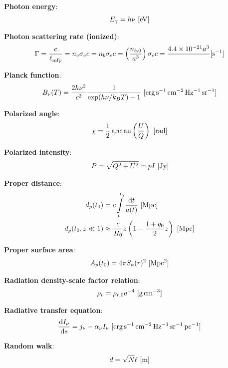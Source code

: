 \documentclass[a4paper,11pt]{article}
\begin{document}
{\noindent}\textbf{Photon energy}:
\begin{align*}
    E_\gamma = h\nu ~ [{\rm eV}]
\end{align*}

{\noindent}\textbf{Photon scattering rate (ionized)}:
\begin{align*}
    \Gamma = \dfrac{c}{\ell_\mathrm{mfp}} = n_e\sigma_ec = n_b\sigma_ec = \left(\dfrac{n_{b,0}}{a^3}\right)\sigma_ec = \dfrac{4.4\times10^{-21}{a^3}} ~ [{\rm s^{-1}}]
\end{align*}

{\noindent}\textbf{Planck function}:
\begin{align*}
    B_\nu(T) = \frac{2h\nu^2}{c^2} \frac{1}{\exp(h\nu/k_BT) - 1} ~ [{\rm erg\,s^{-1}\,cm^{-2}\,Hz^{-1}\,sr^{-1}}]
\end{align*}

{\noindent}\textbf{Polarized angle}:
\begin{align*}
    \chi = \frac{1}{2}\arctan\left(\frac{U}{Q}\right) ~ [{\rm rad}]
\end{align*}

{\noindent}\textbf{Polarized intensity}:
\begin{align*}
    P = \sqrt{Q^2 + U^2} = pI ~ [{\rm Jy}]
\end{align*}

{\noindent}\textbf{Proper distance}:
\begin{align*}
    d_p(t_0) &= c\int\limits_t^{t_0}\frac{\mathrm{d}t}{a(t)} ~ [{\rm Mpc}] \\
    d_p(t_0,z\ll1) &\approx \frac{c}{H_0}z \left(1-\frac{1+q_0}{2}z\right) ~ [{\rm Mpc}]
\end{align*}

{\noindent}\textbf{Proper surface area}:
\begin{align*}
    A_p(t_0) = 4\pi S_\kappa(r)^2 ~ [{\rm Mpc^2}]
\end{align*}

{\noindent}\textbf{Radiation density-scale factor relation}:
\begin{align*}
    \rho_r = \rho_{r,0}a^{-4} ~ [{\rm g\,cm^{-3}}]
\end{align*}

{\noindent}\textbf{Radiative transfer equation}:
\begin{align*}
    \frac{\mathrm{d}I_\nu}{\mathrm{d}s} = j_\nu - \alpha_\nu I_\nu ~ [{\rm erg\,s^{-1}\,cm^{-2}\,Hz^{-1}\,sr^{-1}\,pc^{-1}}]
\end{align*}

{\noindent}\textbf{Random walk}:
\begin{align*}
    d = \sqrt{N}\ell ~ [{\rm m}]
\end{align*}
\end{document}
